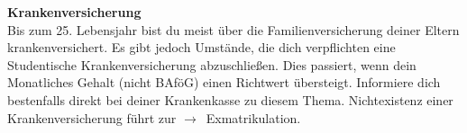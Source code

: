 \begin{multicols}{2}



\textbf{Krankenversicherung} \\
Bis zum 25. Lebensjahr bist du meist über die Familienversicherung deiner Eltern krankenversichert.
Es gibt jedoch Umstände, die dich verpflichten eine Studentische Krankenversicherung abzuschließen.
Dies passiert, wenn dein Monatliches Gehalt (nicht BAföG) einen Richtwert übersteigt.
Informiere dich bestenfalls direkt bei deiner Krankenkasse zu diesem Thema.
Nichtexistenz einer Krankenversicherung führt zur \mbox{$\rightarrow$~Exmatrikulation}.






\end{multicols}
